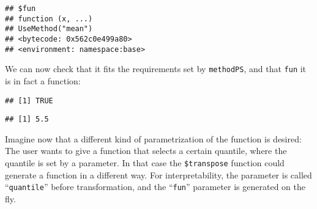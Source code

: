 \documentclass[
]{scrbook}
\newenvironment{Shaded}{\begin{snugshade}}{\end{snugshade}}
\newcommand{\AttributeTok}[1]{\textcolor[rgb]{0.77,0.63,0.00}{#1}}
\newcommand{\CommentTok}[1]{\textcolor[rgb]{0.56,0.35,0.01}{\textit{#1}}}
\newcommand{\ControlFlowTok}[1]{\textcolor[rgb]{0.13,0.29,0.53}{\textbf{#1}}}
\newcommand{\DecValTok}[1]{\textcolor[rgb]{0.00,0.00,0.81}{#1}}
\newcommand{\FunctionTok}[1]{\textcolor[rgb]{0.00,0.00,0.00}{#1}}
\newcommand{\NormalTok}[1]{#1}
\newcommand{\OtherTok}[1]{\textcolor[rgb]{0.56,0.35,0.01}{#1}}
\newcommand{\SpecialCharTok}[1]{\textcolor[rgb]{0.00,0.00,0.00}{#1}}
\newcommand{\StringTok}[1]{\textcolor[rgb]{0.31,0.60,0.02}{#1}}
\renewenvironment{Shaded} {\begin{snugshade}\small} {\end{snugshade}}
\begin{document}
\begin{verbatim}
## $fun
## function (x, ...) 
## UseMethod("mean")
## <bytecode: 0x562c0e499a80>
## <environment: namespace:base>
\end{verbatim}

We can now check that it fits the requirements set by \texttt{methodPS}, and that \texttt{fun} it is in fact a function:

\begin{Shaded}
\end{Shaded}

\begin{verbatim}
## [1] TRUE
\end{verbatim}

\begin{Shaded}
\end{Shaded}

\begin{verbatim}
## [1] 5.5
\end{verbatim}

Imagine now that a different kind of parametrization of the function is desired:
The user wants to give a function that selects a certain quantile, where the quantile is set by a parameter.
In that case the \texttt{\$transpose} function could generate a function in a different way.
For interpretability, the parameter is called ``\texttt{quantile}'' before transformation, and the ``\texttt{fun}'' parameter is generated on the fly.

\begin{Shaded}
\end{Shaded}
\end{document}

